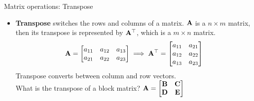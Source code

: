 \documentclass[aspectratio=169]{beamer}
\begin{document}
\begin{frame}[t]{Matrix operations: Transpose}
  \begin{itemize}
    \item \textbf{Transpose} switches the rows and columns of a matrix. $\mathbf{A}$ is a $n\times m$ matrix, then its transpose is represented by $\mathbf{A}^{\top}$, which is a $m \times n$ matrix.
    \[ \mathbf{A} = \begin{bmatrix}
      a_{11} & a_{12} & a_{13}\\
      a_{21} & a_{22} & a_{23}\\
    \end{bmatrix} \implies \mathbf{A}^{\top} = \begin{bmatrix}
      a_{11} & a_{21}\\
      a_{12} & a_{22}\\
      a_{13} & a_{23}\\
    \end{bmatrix} \]
    Transpose converts between column and row vectors.\\
    What is the transpose of a block matrix? $\mathbf{A} = \begin{bmatrix}
      \mathbf{B} & \mathbf{C}\\\mathbf{D} & \mathbf{E}
    \end{bmatrix}$
  \end{itemize}
\end{frame}
\end{document}
